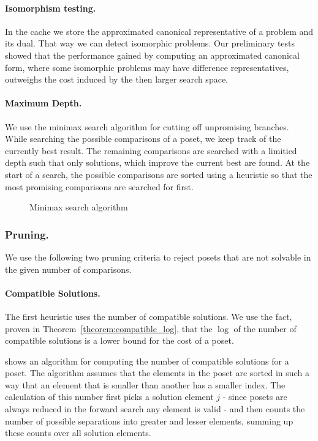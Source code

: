 \documentclass[twoside,leqno,twocolumn]{article}
\begin{document}
\paragraph{Isomorphism testing.}
In the cache we store the approximated canonical representative of a problem and its dual.
That way we can detect isomorphic problems.
Our preliminary tests showed that the performance gained by computing an approximated canonical form, where some isomorphic problems may have difference representatives, outweighs the cost induced by the then larger search space.

\paragraph{Maximum Depth.}
We use the minimax search algorithm for cutting off unpromising branches.
While searching the possible comparisons of a poset, we keep track of the currently best result.
The remaining comparisons are searched with a limitied depth such that only solutions, which improve the current best are found.
At the start of a search, the possible comparisons are sorted using a heuristic so that the most promising comparisons are searched for first.

\begin{figure}[!b]
  \centering
  
  \caption{Minimax search algorithm}
  \label{fig:minimax_search}
\end{figure}

\subsubsection{Pruning.}
We use the following two pruning criteria to reject posets that are not solvable in the given number of comparisons.

\paragraph{Compatible Solutions.}
The first heuristic uses the number of compatible solutions.
We use the fact, proven in Theorem~\ref{theorem:compatible_log}, that the $\log$ of the number of compatible solutions is a lower bound for the cost of a poset.

 shows an algorithm for computing the number of compatible solutions for a poset.
The algorithm assumes that the elements in the poset are sorted in such a way that an element that is smaller than another has a smaller index.
The calculation of this number first picks a solution element $j$ - since posets are always reduced in the forward search any element is valid - and then counts the number of possible separations into greater and lesser elements, summing up these counts over all solution elements.
\end{document}
